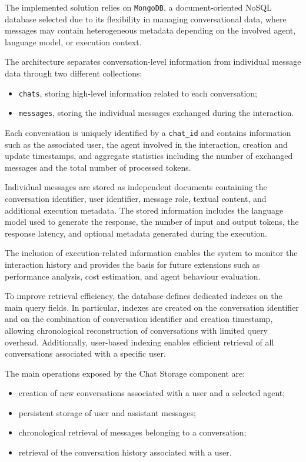 The implemented solution relies on \texttt{MongoDB}, a document-oriented NoSQL database selected due to its flexibility in managing conversational data, where messages may contain heterogeneous metadata depending on the involved agent, language model, or execution context.

The architecture separates conversation-level information from individual message data through two different collections:

\begin{itemize}
    \item \texttt{chats}, storing high-level information related to each conversation;
    \item \texttt{messages}, storing the individual messages exchanged during the interaction.
\end{itemize}

Each conversation is uniquely identified by a \texttt{chat\_id} and contains information such as the associated user, the agent involved in the interaction, creation and update timestamps, and aggregate statistics including the number of exchanged messages and the total number of processed tokens.

Individual messages are stored as independent documents containing the conversation identifier, user identifier, message role, textual content, and additional execution metadata. The stored information includes the language model used to generate the response, the number of input and output tokens, the response latency, and optional metadata generated during the execution.

The inclusion of execution-related information enables the system to monitor the interaction history and provides the basis for future extensions such as performance analysis, cost estimation, and agent behaviour evaluation.

To improve retrieval efficiency, the database defines dedicated indexes on the main query fields. In particular, indexes are created on the conversation identifier and on the combination of conversation identifier and creation timestamp, allowing chronological reconstruction of conversations with limited query overhead. Additionally, user-based indexing enables efficient retrieval of all conversations associated with a specific user.

The main operations exposed by the Chat Storage component are:

\begin{itemize}
    \item creation of new conversations associated with a user and a selected agent;
    \item persistent storage of user and assistant messages;
    \item chronological retrieval of messages belonging to a conversation;
    \item retrieval of the conversation history associated with a user.
\end{itemize}

